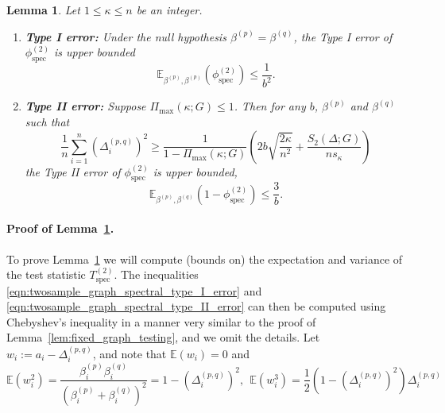 \documentclass{article}
\newcommand{\1}{\mathbf{1}}
\newcommand{\betap}{\beta^{(p)}}
\newcommand{\betaq}{\beta^{(q)}}
\newcommand{\vardeltapq}{\varDelta^{(p,q)}}
\newcommand{\Ebb}{\mathbb{E}}
\newcommand{\spec}{\mathrm{spec}}
\theoremstyle{alden}
\theoremstyle{aldenthm}
\newtheorem{lemma}{Lemma}
\theoremstyle{definition}
\theoremstyle{remark}
\begin{document}
\begin{lemma}
	\label{lem:twosample_fixed_graph_testing}
	Let $1 \leq \kappa \leq n$ be an integer.
	\begin{enumerate}
		\item \textbf{Type I error:} Under the null hypothesis $\betap = \betaq$, the Type I error of $\phi_{\spec}^{(2)}$ is upper bounded
		\begin{equation}
		\label{eqn:twosample_graph_spectral_type_I_error}
		\mathbb{E}_{\betap,\betap}(\phi_{\spec}^{(2)}) \leq \frac{1}{b^2}.
		\end{equation}
		\item \textbf{Type II error:} Suppose $\Pi_{\max}(\kappa;G) \leq 1$. Then for any $b$, $\betap$ and $\betaq$ such that
		\begin{equation}
		\label{eqn:twosample_fixed_graph_testing_critical_radius}
		\frac{1}{n} \sum_{i = 1}^{n} (\varDelta_i^{(p,q)})^2 \geq \frac{1}{1 - \Pi_{\max}(\kappa;G)}\left(2b\sqrt{\frac{2\kappa}{n^2}} + \frac{S_2(\varDelta;G)}{ns_{\kappa}}\right)
		\end{equation}
		the Type II error of $\phi_{\spec}^{(2)}$ is upper bounded,
		\begin{equation}
		\label{eqn:twosample_graph_spectral_type_II_error}
		\mathbb{E}_{\betap,\betaq}(1 - \phi_{\spec}^{(2)}) \leq \frac{3}{b}.
		\end{equation}
	\end{enumerate}
\end{lemma}

\paragraph{Proof of Lemma~\ref{lem:twosample_fixed_graph_testing}.}

To prove Lemma~\ref{lem:twosample_fixed_graph_testing} we will compute (bounds on) the expectation and variance of the test statistic $T_{\mathrm{spec}}^{(2)}$. The inequalities \eqref{eqn:twosample_graph_spectral_type_I_error} and \eqref{eqn:twosample_graph_spectral_type_II_error} can then be computed using Chebyshev's inequality in a manner very similar to the proof of Lemma~\ref{lem:fixed_graph_testing}, and we omit the details. Let $w_i := a_i - \vardeltapq_{i}$, and note that $\Ebb(w_i) = 0$ and
\begin{equation*}
\Ebb(w_i^2) = \frac{\betap_i \betaq_i}{(\betap_i + \betaq_i)^2} = 1 - (\vardeltapq_{i})^2,~~ \Ebb(w_i^3) = \frac{1}{2}(1 - (\vardeltapq_{i})^2)\vardeltapq_{i}
\end{equation*}
\end{document}

